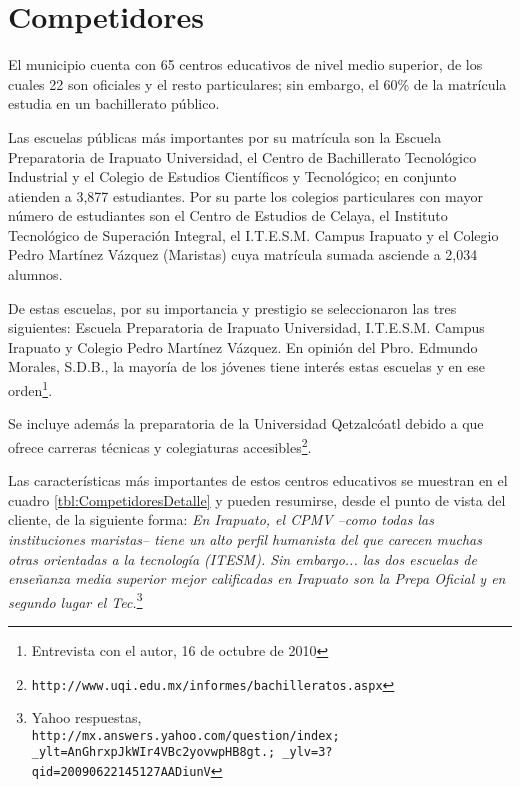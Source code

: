 \section{Competidores}

El municipio cuenta con 65 centros educativos de nivel medio superior, de los cuales 22 son oficiales y el resto particulares; sin embargo, el 60\% de la matrícula estudia en un bachillerato público.

Las escuelas públicas más importantes por su matrícula son la Escuela Preparatoria de Irapuato Universidad, el Centro de Bachillerato Tecnol\'ogico Industrial y el Colegio de Estudios Cient\'ificos y Tecnol\'ogico;
 en conjunto atienden a 3,877 estudiantes. Por su parte los colegios particulares con mayor número de estudiantes son el Centro de Estudios de Celaya, el Instituto Tecnol\'ogico de Superaci\'on Integral, el I.T.E.S.M. Campus Irapuato y el Colegio Pedro Mart\'inez V\'azquez (Maristas) cuya matrícula sumada asciende a 2,034 alumnos.

De estas escuelas, por su importancia y prestigio se seleccionaron las tres siguientes: Escuela Preparatoria de Irapuato Universidad, I.T.E.S.M. Campus Irapuato y Colegio Pedro Mart\'inez V\'azquez. En opini\'on del Pbro. Edmundo Morales, S.D.B., la mayoría de los jóvenes tiene interés estas escuelas y en ese orden\footnote{Entrevista con el autor, 16 de octubre de 2010}.

Se incluye además la preparatoria de la Universidad Qetzalcóatl debido a que ofrece carreras técnicas y colegiaturas accesibles\footnote{\texttt{http://www.uqi.edu.mx/informes/bachilleratos.aspx}}.

Las características m\'as importantes de estos centros educativos se muestran en el cuadro \ref{tbl:CompetidoresDetalle} y pueden resumirse, desde el punto de vista del cliente, de la siguiente forma: \emph{En Irapuato, el CPMV --como todas las instituciones maristas-- tiene un alto perfil humanista del que carecen muchas otras orientadas a la tecnología (ITESM). Sin embargo... las dos escuelas de enseñanza media superior mejor calificadas en Irapuato son la Prepa Oficial y en segundo lugar el Tec.}\footnote{Yahoo respuestas,\\
\texttt{http://mx.answers.yahoo.com/question/index; \_ylt=AnGhrxpJkWIr4VBc2yovwpHB8gt.; \_ylv=3?qid=20090622145127AADiunV}}





